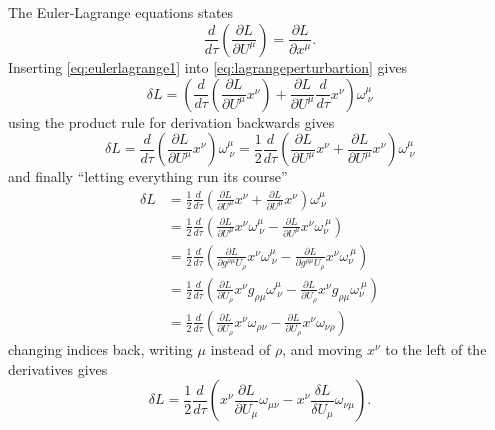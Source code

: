 \documentclass[11pt]{amsart}
\begin{document}
\subsection{}
The Euler-Lagrange equations states
\begin{equation}
\label{eq:eulerlagrange1}
\frac{d}{d\tau}\left(\frac{\partial L}{\partial U^\mu} \right) = \frac{\partial L}{\partial x^\mu}.
\end{equation}
Inserting \ref{eq:eulerlagrange1} into \ref{eq:lagrangeperturbartion} gives
\begin{equation}
\delta L = \left(\frac{d}{d\tau}\left(\frac{\partial L}{\partial U^\mu}x^\nu \right) + \frac{\partial L}{\partial U^\mu}\frac{d}{d\tau}x^\nu \right)\omega^\mu_{\ \nu}
\end{equation}
using the product rule for derivation backwards gives
\begin{equation}
\delta L = \frac{d}{d\tau}\left(\frac{\partial L}{\partial U^\mu}x^\nu \right)\omega^\mu_{\ \nu} 
= \frac{1}{2}\frac{d}{d\tau}\left(\frac{\partial L}{\partial U^\mu}x^\nu + \frac{\partial L}{\partial U^\mu}x^\nu \right)\omega^\mu_{\ \nu}
\end{equation}
and finally ``letting everything run its course''
\begin{align*}
\delta L &= \frac{1}{2}\frac{d}{d\tau}\left(\frac{\partial L}{\partial U^\mu}x^\nu + \frac{\partial L}{\partial U^\mu}x^\nu \right)\omega^\mu_{\ \nu} \\
		&= \frac{1}{2}\frac{d}{d\tau}\left(\frac{\partial L}{\partial U^\mu}x^\nu \omega^\mu_{\ \nu} -\frac{\partial L}{\partial U^\mu}x^\nu\omega_\nu^{\ \mu} \right) \\
		&= \frac{1}{2}\frac{d}{d\tau}\left(\frac{\partial L}{\partial g^{\rho\mu}U_\rho}x^\nu \omega^\mu_{\ \nu} -\frac{\partial L}{\partial g^{\rho\mu}U_\rho}x^\nu\omega_\nu^{\ \mu} \right) \\
		&= \frac{1}{2}\frac{d}{d\tau}\left(\frac{\partial L}{\partial U_\rho}x^\nu g_{\rho\mu} \omega^\mu_{\ \nu} -\frac{\partial L}{\partial U_\rho}x^\nu g_{\rho\mu}\omega_\nu^{\ \mu} \right) \\
		&= \frac{1}{2}\frac{d}{d\tau}\left(\frac{\partial L}{\partial U_\rho}x^\nu  \omega_{\rho\nu} -\frac{\partial L}{\partial U_\rho}x^\nu \omega_{\nu\rho} \right)		
\end{align*} 
changing indices back, writing $\mu$ instead of $\rho$, and moving $x^\nu$ to the left of the derivatives gives
\begin{equation*}
\delta L = \frac{1}{2}\frac{d}{d\tau}\left(x^\nu\frac{\partial L}{\partial U_\mu}  \omega_{\mu\nu} - x^\nu\frac{\delta L}{\delta U_\mu} \omega_{\nu\mu} \right).		
\end{equation*}
\end{document}
